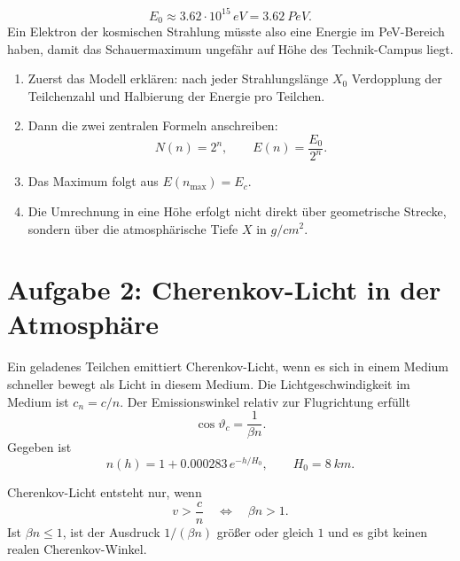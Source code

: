 \documentclass[11pt,a4paper]{scrartcl}
\theoremstyle{definition}
\theoremstyle{plain}
\theoremstyle{remark}
\begin{document}
\begin{answerbox}
\[
    \boxed{E_0\approx 3.62\cdot 10^{15}\,\si{eV}=\SI{3.62}{PeV}}.
\]
Ein Elektron der kosmischen Strahlung m\"usste also eine Energie im PeV-Bereich haben, damit das Schauermaximum ungef\"ahr auf H\"ohe des Technik-Campus liegt.
\end{answerbox}

\begin{summarybox}[title=Tafelvortrag zu Aufgabe 1]
\begin{enumerate}
    \item Zuerst das Modell erkl\"aren: nach jeder Strahlungsl\"ange $X_0$ Verdopplung der Teilchenzahl und Halbierung der Energie pro Teilchen.
    \item Dann die zwei zentralen Formeln anschreiben:
    \[
        N(n)=2^n,\qquad E(n)=\frac{E_0}{2^n}.
    \]
    \item Das Maximum folgt aus $E(n_{\max})=E_c$.
    \item Die Umrechnung in eine H\"ohe erfolgt nicht direkt \"uber geometrische Strecke, sondern \"uber die atmosph\"arische Tiefe $X$ in $\si{g/cm^2}$.
\end{enumerate}
\end{summarybox}

\FloatBarrier
\newpage

\section{Aufgabe 2: Cherenkov-Licht in der Atmosph\"are}

\begin{taskbox}
Ein geladenes Teilchen emittiert Cherenkov-Licht, wenn es sich in einem Medium schneller bewegt als Licht in diesem Medium. Die Lichtgeschwindigkeit im Medium ist $c_n=c/n$. Der Emissionswinkel relativ zur Flugrichtung erf\"ullt
\[
    \cos\vartheta_c=\frac{1}{\beta n}.
\]
Gegeben ist
\[
    n(h)=1+0.000283\,e^{-h/H_0},
    \qquad H_0=\SI{8}{km}.
\]
\end{taskbox}

\begin{definitionbox}[title=Cherenkov-Bedingung]
Cherenkov-Licht entsteht nur, wenn
\[
    v>\frac{c}{n}
    \quad\Longleftrightarrow\quad
    \beta n>1.
\]
Ist $\beta n\leq 1$, ist der Ausdruck $1/(\beta n)$ gr\"o\ss{}er oder gleich $1$ und es gibt keinen realen Cherenkov-Winkel.
\end{definitionbox}
\end{document}
